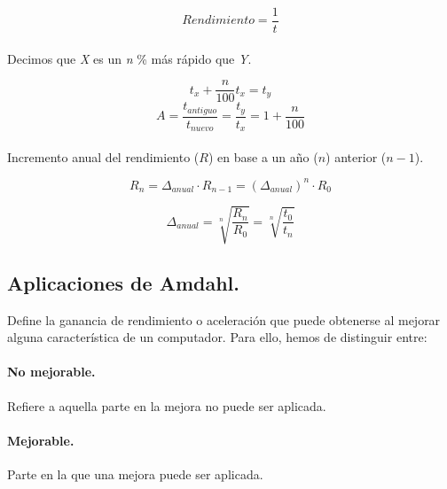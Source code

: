 \documentclass{article}
\begin{document}
\begin{multicols}{2}
		\begin{displaymath}
				Rendimiento = \frac 1 t
		\end{displaymath}
		
		\paragraph{}
		Decimos que \textit{X} es un \textit{n} \% más rápido que \textit{Y}. 
		
		\begin{displaymath}
				t_{x} + \frac n {100} t_{x} = t_{y} 
		\end{displaymath}		
		\begin{displaymath}
				A = \frac {t_{antiguo}} {t_{nuevo}} = \frac {t_{y}} {t_{x}} = 1 + \frac n {100}
		\end{displaymath}
		
		\paragraph{}
		Incremento anual del rendimiento ($R$) en base a un año ($n$) anterior ($n-1$).
		 
		\begin{displaymath}
			R_{n} = \Delta_{anual} \cdot R_{n-1} = (\Delta_{anual})^n \cdot R_0
		\end{displaymath}
		
		\begin{displaymath}
			\Delta_{anual} = \sqrt[n]{\frac {R_n} {R_0}} = \sqrt[n]{\frac {t_0} {t_n}} 
		\end{displaymath}
		
		\subsection{Aplicaciones de Amdahl.}
		Define la ganancia de rendimiento o aceleración que puede obtenerse al mejorar alguna característica de un computador. Para ello, hemos de distinguir entre:
		
		\paragraph{No mejorable.}
		Refiere a aquella parte en la mejora no puede ser aplicada.
		
		\paragraph{Mejorable.}
		Parte en la que una mejora puede ser aplicada.
		

\end{multicols}
\end{document}
